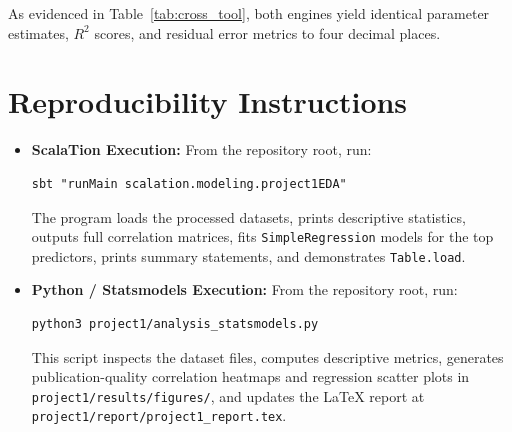 \documentclass[11pt]{article}
\begin{document}
As evidenced in Table~\ref{tab:cross_tool}, both engines yield identical parameter estimates, $R^2$ scores, and residual error metrics to four decimal places. 

\section{Reproducibility Instructions}
\begin{itemize}
    \item \textbf{ScalaTion Execution:} From the repository root, run:
    \begin{verbatim}
sbt "runMain scalation.modeling.project1EDA"
    \end{verbatim}
    The program loads the processed datasets, prints descriptive statistics, outputs full correlation matrices, fits \texttt{SimpleRegression} models for the top predictors, prints summary statements, and demonstrates \texttt{Table.load}.
    \item \textbf{Python / Statsmodels Execution:} From the repository root, run:
    \begin{verbatim}
python3 project1/analysis_statsmodels.py
    \end{verbatim}
    This script inspects the dataset files, computes descriptive metrics, generates publication-quality correlation heatmaps and regression scatter plots in \texttt{project1/results/figures/}, and updates the LaTeX report at \texttt{project1/report/project1_report.tex}.
\end{itemize}
\end{document}
